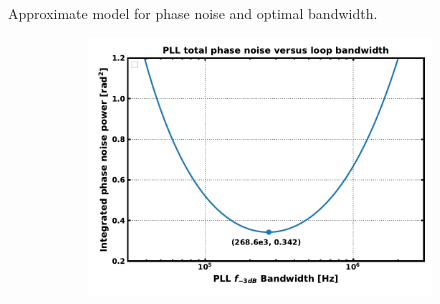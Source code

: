 \documentclass[t, screen, aspectratio=43]{beamer}
\begin{document}
\begin{frame}
\begin{block}{Approximate model for phase noise and optimal bandwidth.}
\begin{figure}[htb!]
\begin{subfigure}{0.33\textwidth}
	        \center\includegraphics[width=1.0\textwidth, angle=0]{bandwidth_vs_pn.pdf}
	    \end{subfigure}
	\end{figure}

	\end{block}	
\end{frame}
\end{document}
